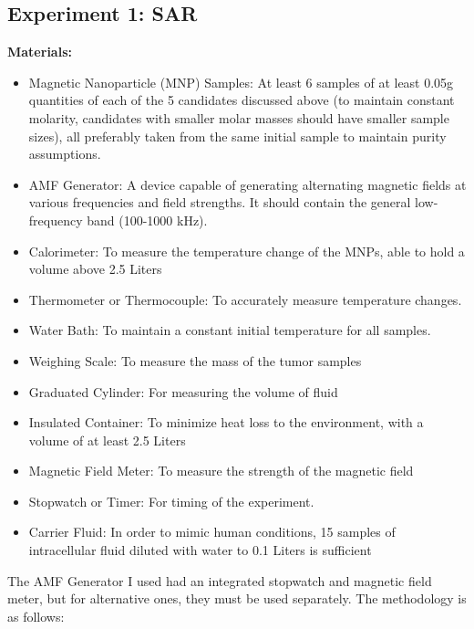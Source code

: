 \documentclass[12pt]{article}
\numberwithin{equation}{section}
\numberwithin{equation}{section}
\begin{document}
\subsection{Experiment 1: SAR}
\textbf{Materials:}
\begin{itemize}
    \item Magnetic Nanoparticle (MNP) Samples: {At least 6 samples of at least 0.05g quantities of each of the 5 candidates discussed above (to maintain constant molarity, candidates with smaller molar masses should have smaller sample sizes), all preferably taken from the same initial sample to maintain purity assumptions.}
    \item AMF Generator: A device capable of generating alternating magnetic fields at various frequencies and field strengths. {It should contain the general low-frequency band (100-1000 kHz).}
    \item Calorimeter: To measure the temperature change of the MNPs, able to hold a volume above 2.5 Liters
    \item Thermometer or Thermocouple: To accurately measure temperature changes.
    \item Water Bath: To maintain a constant initial temperature for all samples.
    \item {Weighing Scale: To measure the mass of the tumor samples}
    \item {Graduated Cylinder: For measuring the volume of fluid}
    \item Insulated Container: To minimize heat loss to the environment, with a volume of at least 2.5 Liters
    \item Magnetic Field Meter: To measure the strength of the magnetic field
    \item Stopwatch or Timer: For timing of the experiment.
    \item Carrier Fluid: In order to mimic human conditions,{ 15 samples of intracellular fluid diluted with water to 0.1 Liters is sufficient}
\end{itemize}
The AMF Generator I used had an integrated stopwatch and magnetic field meter, but for alternative ones, they must be used separately. The methodology is as follows:
\end{document}
